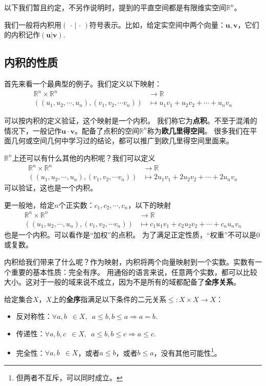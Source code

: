 \documentclass[12pt,UTF8,fontset=none]{ctexbook}
\begin{document}
以下我们暂且约定，不另作说明时，提到的平直空间都是有限维实空间$\mathbb{R}^n$。

我们一般将内积用$(\,\cdot \,|\, \cdot\,)$符号表示。比如，给定实空间中两个向量：$\mathbf{u}, \mathbf{v}$，它们的内积记作$(\mathbf{u} | \mathbf{v})$.

\subsection{内积的性质}
首先来看一个最典型的例子。我们定义以下映射：
\begin{align*}
    \mathbb{R}^n \times \mathbb{R}^n &\rightarrow \mathbb{R}  \\
   \left((u_1, u_2, \cdots, u_n) , (v_1, v_2, \cdots v_n)\right) &\mapsto u_1v_1 + u_2v_2 + \cdots + u_n v_n 
\end{align*}

可以按内积的定义验证，这个映射是一个内积。
我们称它为\textbf{点积}。不至于混淆的情况下，一般记作$\mathbf{u} \cdot \mathbf{v}$。配备了点积的空间$\mathbb{R}^n$称为\textbf{欧几里得空间}。
很多我们在平面几何或空间几何中学习过的结论，都可以推广到欧几里得空间里面来。

$\mathbb{R}^n$上还可以有什么其他的内积呢？我们可以定义
\begin{align*}
    \mathbb{R}^n \times \mathbb{R}^n &\rightarrow \mathbb{R}  \\
   \left((u_1, u_2, \cdots, u_n) , (v_1, v_2, \cdots v_n)\right) &\mapsto 2u_1v_1 + 2u_2v_2 + \cdots + 2u_n v_n 
\end{align*}
可以验证，这也是一个内积。

更一般地，给定$n$个正实数：$c_1, c_2, \cdots, c_n$，以下的映射
\begin{align*}
    \mathbb{R}^n \times \mathbb{R}^n &\rightarrow \mathbb{R}  \\
   \left((u_1, u_2, \cdots, u_n) , (v_1, v_2, \cdots v_n)\right) &\mapsto c_1u_1v_1 + c_2u_2v_2 + \cdots + c_nu_n v_n 
\end{align*}
也是一个内积。可以看作是“加权”的点积。
为了满足正定性质，“权重”不可以是0或复数。

内积给我们带来了什么呢？作为映射，内积将两个向量映射到一个实数。实数有一个重要的基本性质：完全有序。
用通俗的语言来说，任意两个实数，都可以比较大小。这对于一般的域来说不成立，因为不是所有的域都配备了\textbf{全序关系}。

\begin{df}\label{df:7_2}
    给定集合$X$，$X$上的\textbf{全序}指满足以下条件的二元关系$\leqslant :  X \times X \rightarrow X$：
    \begin{itemize}
        \item 反对称性：$ \forall a, b \,\,\, \in X, \,\,\, a \leqslant b, b\leqslant a \Rightarrow a = b.$
        \item 传递性：$ \forall a, b, c \,\,\, \in X, \,\,\, a \leqslant b, b\leqslant c \Rightarrow a \leqslant c.$
        \item 完全性：$ \forall a, b \,\,\, \in X$，或者$a \leqslant b$，或者$b\leqslant a$，没有其他可能性\footnote{但两者不互斥，可以同时成立。}。
    \end{itemize}
    
\end{df}
\end{document}
